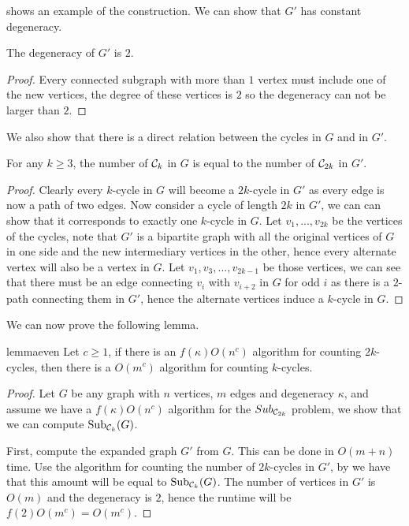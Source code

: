 \documentclass[a4paper,UKenglish,cleveref, autoref, numberwithinsect, thm-restate]{lipics-v2021}
\newcommand{\cycle}[1]{\cC_{#1}}
\newcommand{\expandG}{G'}
\newcommand{\Sub}[2]{\mathrm{Sub}_{#2}(#1)}
\newcommand{\degen}{\kappa}
\newcommand{\cC}{{\cal C}}
\begin{document}
		 shows an example of the construction. We can show that $\expandG$ has constant degeneracy.
		
		\begin{claim} \label{lem:degen}
			The degeneracy of $\expandG$ is $2$.
		\end{claim}
		\begin{proof}
			Every connected subgraph with more than $1$ vertex must include one of the new vertices, the degree of these vertices is $2$ so the degeneracy can not be larger than $2$.
		\end{proof}
	
		We also show that there is a direct relation between the cycles in $G$ and in $\expandG$.
	
		\begin{lemma} \label{lem:equivalence}
			For any $k\geq 3$, the number of $\cycle{k}$ in $G$ is equal to the number of $\cycle{2k}$ in $\expandG$.
		\end{lemma}
		\begin{proof}
			Clearly every $k$-cycle in $G$ will become a $2k$-cycle in $\expandG$ as every edge is now a path of two edges. Now consider a cycle of length $2k$ in $\expandG$, we can can show that it corresponds to exactly one $k$-cycle in $G$. Let $v_1,...,v_{2k}$ be the vertices of the cycles, note that $\expandG$ is a bipartite graph with all the original vertices of $G$ in one side and the new intermediary vertices in the other, hence every alternate vertex will also be a vertex in $G$. Let $v_1,v_3,...,v_{2k-1}$ be those vertices, we can see that there must be an edge connecting $v_i$ with $v_{i+2}$ in $G$ for odd $i$ as there is a $2$-path connecting them in $\expandG$, hence the alternate vertices induce a $k$-cycle in $G$.
		\end{proof}
	
		We can now prove the following lemma.
		
		\begin{restatable}{lemma}{even} \label{thm:even}
			Let $c\geq 1$, if there is an $f(\degen)O(n^c)$ algorithm for counting $2k$-cycles, then there is a $O(m^c)$ algorithm for counting $k$-cycles. 
		\end{restatable}
		\begin{proof}
			Let $G$ be any graph with $n$ vertices, $m$ edges and degeneracy $\degen$, and assume we have a $f(\degen)O(n^c)$ algorithm for the $Sub_{\cycle{2k}}$ problem, we show that we can compute $\Sub{G}{\cycle{k}}$.
			
			First, compute the expanded graph $\expandG$ from $G$. This can be done in $O(m+n)$ time. Use the algorithm for counting the number of $2k$-cycles in $\expandG$, by  we have that this amount will be equal to $\Sub{G}{\cycle{k}}$. The number of vertices in $G'$ is $O(m)$ and the degeneracy is $2$, hence the runtime will be $f(2)O(m^c) = O(m^c)$.
		\end{proof}
		
\end{document}
